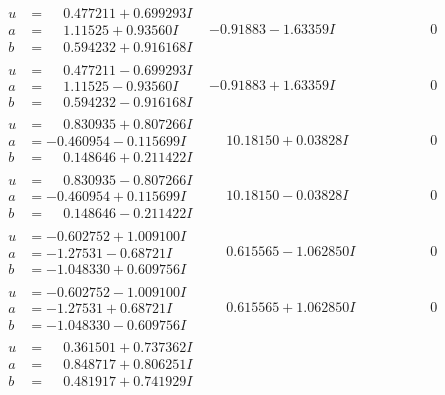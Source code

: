 \documentclass[1p]{elsarticle_modified}
\theoremstyle{definition}
\begin{document}
$$\begin{array}{c|c|c}
\begin{aligned}
u &= \phantom{-}0.477211 + 0.699293 I \\
a &= \phantom{-}1.11525 + 0.93560 I \\
b &= \phantom{-}0.594232 + 0.916168 I\end{aligned}
 & -0.91883 - 1.63359 I & \phantom{-0.000000 } 0 \\ \hline\begin{aligned}
u &= \phantom{-}0.477211 - 0.699293 I \\
a &= \phantom{-}1.11525 - 0.93560 I \\
b &= \phantom{-}0.594232 - 0.916168 I\end{aligned}
 & -0.91883 + 1.63359 I & \phantom{-0.000000 } 0 \\ \hline\begin{aligned}
u &= \phantom{-}0.830935 + 0.807266 I \\
a &= -0.460954 - 0.115699 I \\
b &= \phantom{-}0.148646 + 0.211422 I\end{aligned}
 & \phantom{-}10.18150 + 0.03828 I & \phantom{-0.000000 } 0 \\ \hline\begin{aligned}
u &= \phantom{-}0.830935 - 0.807266 I \\
a &= -0.460954 + 0.115699 I \\
b &= \phantom{-}0.148646 - 0.211422 I\end{aligned}
 & \phantom{-}10.18150 - 0.03828 I & \phantom{-0.000000 } 0 \\ \hline\begin{aligned}
u &= -0.602752 + 1.009100 I \\
a &= -1.27531 - 0.68721 I \\
b &= -1.048330 + 0.609756 I\end{aligned}
 & \phantom{-}0.615565 - 1.062850 I & \phantom{-0.000000 } 0 \\ \hline\begin{aligned}
u &= -0.602752 - 1.009100 I \\
a &= -1.27531 + 0.68721 I \\
b &= -1.048330 - 0.609756 I\end{aligned}
 & \phantom{-}0.615565 + 1.062850 I & \phantom{-0.000000 } 0 \\ \hline\begin{aligned}
u &= \phantom{-}0.361501 + 0.737362 I \\
a &= \phantom{-}0.848717 + 0.806251 I \\
b &= \phantom{-}0.481917 + 0.741929 I\end{aligned}

\end{array}$$
\end{document}
